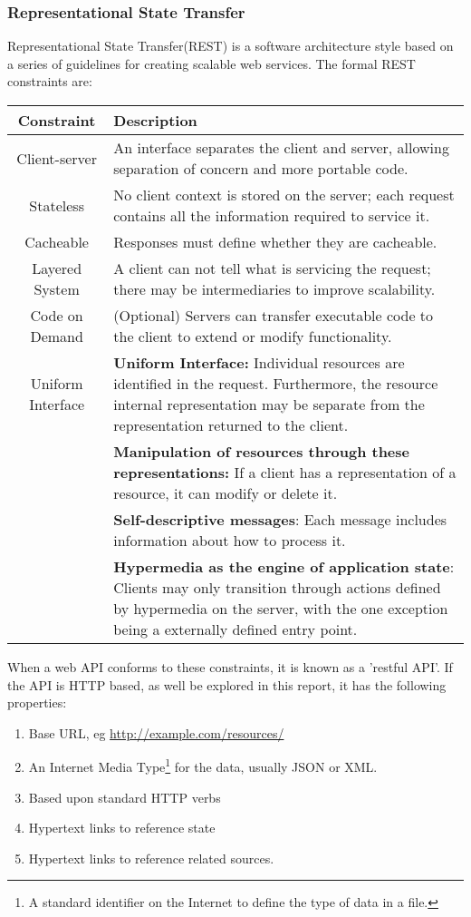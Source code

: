 \subsubsection{Representational State Transfer}
Representational State Transfer(REST) is a software architecture style based on a series of guidelines for creating scalable web services\cite{rest}. The formal REST constraints are:  

\begin{center}
\begin{tabular}{| c | p{10cm} |}
\hline
\textbf{Constraint} & \textbf{Description} \\ \hline
Client-server & An interface separates the client and server, allowing separation of concern and more portable code. \\ \hline
Stateless & No client context is stored on the server; each request contains all the information required to service it. \\ \hline
Cacheable & Responses must define whether they are cacheable. \\ \hline
Layered System & A client can not tell what is servicing the request; there may be intermediaries to improve scalability.\\ \hline
Code on Demand & (Optional) Servers can transfer executable code to the client to extend or modify functionality.\\ \hline
Uniform Interface
& \textbf{Uniform Interface:} Individual resources are identified in the request. Furthermore, the resource internal representation may be separate from the representation returned to the client. \\ \cline{2-2}
& \textbf{Manipulation of resources through these representations:} If a client has a representation of a resource, it can modify or delete it. \\ \cline{2-2}
& \textbf{Self-descriptive messages}: Each message includes information about how to process it. \\ \cline{2-2}
& \textbf{Hypermedia as the engine of application state}: Clients may only transition through actions defined by hypermedia on the server, with the one exception being a externally defined entry point. \\ \hline
\end{tabular}
\end{center}

When a web API conforms to these constraints, it is known as a 'restful API'. If the API is HTTP based, as well be explored in this report, it has the following properties:
\begin{enumerate}
	\setlength{\itemsep}{0pt}
	\item Base URL, eg \url{http://example.com/resources/}
	\item An Internet Media Type\footnote{A standard identifier on the Internet to define the type of data in a file.}\cite{internetmedia} for the data, usually JSON or XML.
	\item Based upon standard HTTP verbs
	\item Hypertext links to reference state
	\item Hypertext links to reference related sources.
\end{enumerate}


